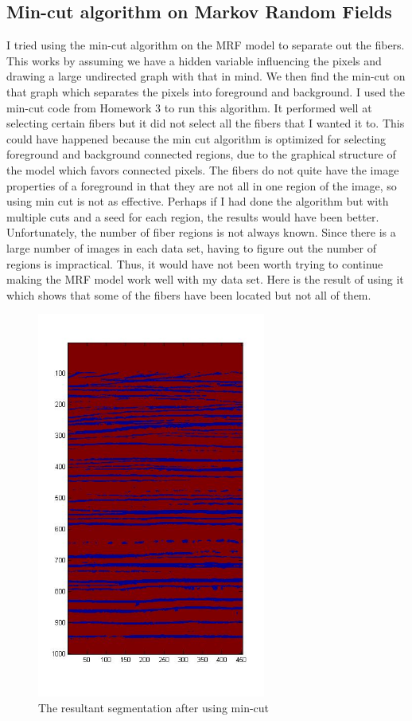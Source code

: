 \documentclass[11pt,psfig]{article}
\begin{document}
\subsection{Min-cut algorithm on Markov Random Fields}
I tried using the min-cut algorithm on the MRF model to separate out the fibers. This works by assuming we have a hidden variable influencing the pixels and drawing a large undirected graph with that in mind. We then find the min-cut on that graph which separates the pixels into foreground and background. I used the min-cut code from Homework 3 to run this algorithm. It performed well at selecting certain fibers but it did not select all the fibers that I wanted it to. This could have happened because the min cut algorithm is optimized for selecting foreground and background connected regions, due to the graphical structure of the model which favors connected pixels. The fibers do not quite have the image properties of a foreground in that they are not all in one region of the image, so using min cut is not as effective. Perhaps if I had done the algorithm but with multiple cuts and a seed for each region, the results would have been better. Unfortunately, the number of fiber regions is not always known. Since there is a large number of images in each data set, having to figure out the number of regions is impractical. Thus, it would have not been worth trying to continue making the MRF model work well with my data set. Here is the result of using it which shows that some of the fibers have been located but not all of them. \\
\begin{figure}[H]
\centering
\includegraphics[height=5in]{minCutResult.jpg}
\caption{The resultant segmentation after using min-cut}
\end{figure}
\end{document}
